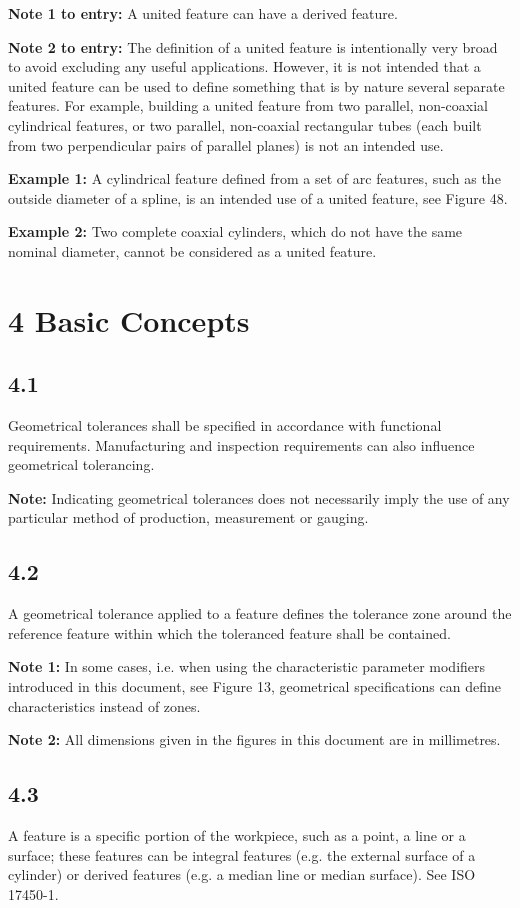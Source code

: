 \documentclass[a4paper,12pt]{article}
\begin{document}
\textbf{Note 1 to entry:} A united feature can have a derived feature.

\textbf{Note 2 to entry:} The definition of a united feature is intentionally very broad to avoid excluding any useful applications. However, it is not intended that a united feature can be used to define something that is by nature several separate features. For example, building a united feature from two parallel, non-coaxial cylindrical features, or two parallel, non-coaxial rectangular tubes (each built from two perpendicular pairs of parallel planes) is not an intended use.

\textbf{Example 1:} A cylindrical feature defined from a set of arc features, such as the outside diameter of a spline, is an intended use of a united feature, see Figure 48.

\textbf{Example 2:} Two complete coaxial cylinders, which do not have the same nominal diameter, cannot be considered as a united feature.

\section*{4 Basic Concepts}

\subsection*{4.1}
Geometrical tolerances shall be specified in accordance with functional requirements. Manufacturing and inspection requirements can also influence geometrical tolerancing.

\textbf{Note:} Indicating geometrical tolerances does not necessarily imply the use of any particular method of production, measurement or gauging.

\subsection*{4.2}
A geometrical tolerance applied to a feature defines the tolerance zone around the reference feature within which the toleranced feature shall be contained.

\textbf{Note 1:} In some cases, i.e. when using the characteristic parameter modifiers introduced in this document, see Figure 13, geometrical specifications can define characteristics instead of zones.

\textbf{Note 2:} All dimensions given in the figures in this document are in millimetres.

\subsection*{4.3}
A feature is a specific portion of the workpiece, such as a point, a line or a surface; these features can be integral features (e.g. the external surface of a cylinder) or derived features (e.g. a median line or median surface). See ISO 17450-1.
\end{document}
